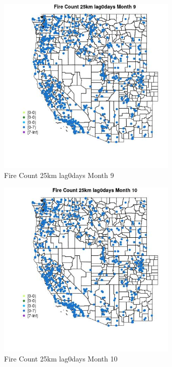 \begin{figure} 
\centering  
\includegraphics[width=0.77\textwidth]{Code_Outputs/Report_ML_input_PM25_Step4_part_e_de_duplicated_aves_compiled_2019-05-21wNAs_MapObsMo9Fire_Count_25km_lag0days.jpg} 
\caption{\label{fig:Report_ML_input_PM25_Step4_part_e_de_duplicated_aves_compiled_2019-05-21wNAsMapObsMo9Fire_Count_25km_lag0days}Fire Count 25km lag0days Month 9} 
\end{figure} 
 

\begin{figure} 
\centering  
\includegraphics[width=0.77\textwidth]{Code_Outputs/Report_ML_input_PM25_Step4_part_e_de_duplicated_aves_compiled_2019-05-21wNAs_MapObsMo10Fire_Count_25km_lag0days.jpg} 
\caption{\label{fig:Report_ML_input_PM25_Step4_part_e_de_duplicated_aves_compiled_2019-05-21wNAsMapObsMo10Fire_Count_25km_lag0days}Fire Count 25km lag0days Month 10} 
\end{figure} 
 

